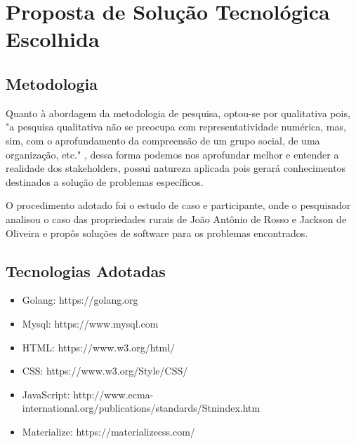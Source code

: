 \documentclass[12pt]{article}
\begin{document}
\begin{titlepage}
\begin{figure}[!h]
\begin{center}

\end{center}
\end{figure}

\newpage

\section{Proposta de Solução Tecnológica Escolhida}

\subsection{Metodologia}


Quanto à abordagem da metodologia de pesquisa, optou-se por qualitativa pois, "a pesquisa qualitativa não se preocupa com representatividade numérica, mas, sim, com o aprofundamento da compreensão de um grupo social, de uma organização, etc." \cite{ufrgs09}, dessa forma podemos nos aprofundar melhor e entender a realidade dos stakeholders, possui natureza aplicada pois gerará conhecimentos destinados a solução de problemas específicos.

O procedimento adotado foi o estudo de caso e participante, onde o pesquisador analisou o caso das propriedades rurais de João Antônio de Rosso e Jackson de Oliveira e propôs soluções de software para os problemas encontrados.

\subsection{Tecnologias Adotadas}

\begin{itemize}
	\item Golang: https://golang.org	
	\item Mysql: https://www.mysql.com
	\item HTML: https://www.w3.org/html/
	\item CSS: https://www.w3.org/Style/CSS/
	\item JavaScript: http://www.ecma-international.org/publications/standards/Stnindex.htm
	\item Materialize: https://materializecss.com/
\end{itemize}


\end{titlepage}
\end{document}
